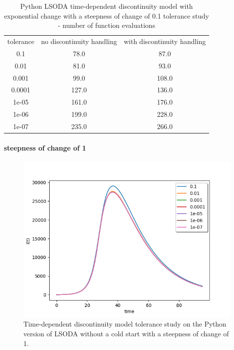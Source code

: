 \begin{table}[H]
\caption {Python LSODA time-dependent discontinuity model with exponential change with a steepness of change of 0.1 tolerance study - number of function evaluations} \label{tab:exp_time_tol_lsoda_0_1} 
\begin{center}
\begin{tabular}{ c c c }
tolerance & no discontinuity handling & with discontinuity handling \\ 
0.1 & 78.0 & 87.0 \\
0.01 & 81.0 & 93.0 \\
0.001 & 99.0 & 108.0 \\
0.0001 & 127.0 & 136.0 \\
1e-05 & 161.0 & 176.0 \\
1e-06 & 199.0 & 228.0 \\
1e-07 & 235.0 & 266.0 \\
\end{tabular}
\end{center}
\end{table}

\paragraph{steepness of change of 1}

\begin{figure}[H]
\centering
\includegraphics[width=0.7\linewidth]{./figures/exp_time_tol_lsoda_no_event_1}
\caption{Time-dependent discontinuity model tolerance study on the Python version of LSODA without a cold start with a steepness of change of 1.}
\label{fig:exp_time_tol_lsoda_no_event_1}
\end{figure}

